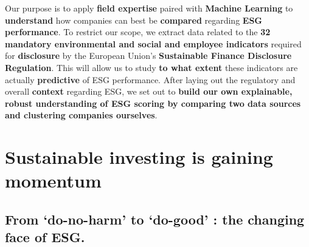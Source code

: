 \documentclass[12pt]{report}
\begin{document}
\newline
Our purpose is to apply \textbf{field expertise} paired with \textbf{Machine Learning} to \textbf{understand} how companies can best be \textbf{compared} regarding \textbf{ESG performance}. To restrict our scope, we extract data related to the \textbf{32 mandatory environmental and social and employee indicators} required for \textbf{disclosure} by the European Union’s \textbf{Sustainable Finance Disclosure Regulation}. This will allow us to study \textbf{to what extent} these indicators are actually \textbf{predictive} of ESG performance. After laying out the regulatory and overall \textbf{context} regarding ESG, we set out to \textbf{build our own explainable, robust understanding of ESG scoring by comparing two data sources and clustering companies ourselves}.


\section{Sustainable investing is gaining momentum}
\subsection{From ‘do-no-harm’ to ‘do-good’ : the changing face of ESG.}
\end{document}

